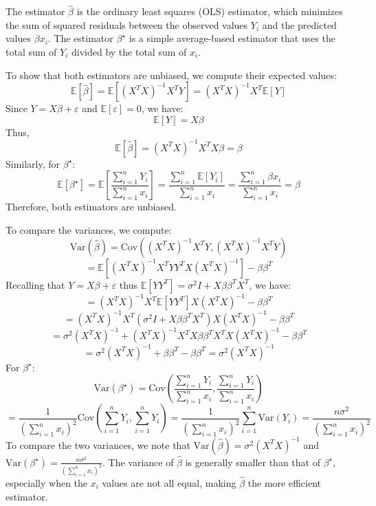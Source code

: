 \begin{answerenum}
    \item The estimator \(\hat{\beta}\) is the ordinary least squares (OLS) estimator, which minimizes the sum of squared residuals between the observed values \(Y_i\) and the predicted values \(\beta x_i\). The estimator \(\beta^{\star}\) is a simple average-based estimator that uses the total sum of \(Y_i\) divided by the total sum of \(x_i\).
    \item To show that both estimators are unbiased, we compute their expected values:
        \[ \mathbb{E}[\hat{\beta}] = \mathbb{E}\left[ (X^T X)^{-1} X^T Y \right] = (X^T X)^{-1} X^T \mathbb{E}[Y] \]
        Since \(Y = X\beta + \varepsilon\) and \(\mathbb{E}[\varepsilon] = 0\), we have:
        \[ \mathbb{E}[Y] = X\beta \]
        Thus,
        \[ \mathbb{E}[\hat{\beta}] = (X^T X)^{-1} X^T X \beta = \beta \]
        Similarly, for \(\beta^{\star}\):
        \[ \mathbb{E}[\beta^{\star}] = \mathbb{E}\left[ \frac{\sum_{i=1}^n Y_i}{\sum_{i=1}^n x_i} \right] = \frac{\sum_{i=1}^n \mathbb{E}[Y_i]}{\sum_{i=1}^n x_i} = \frac{\sum_{i=1}^n \beta x_i}{\sum_{i=1}^n x_i} = \beta \]
        Therefore, both estimators are unbiased.
    \item To compare the variances, we compute:
        \[ \text{Var}(\hat{\beta}) = \text{Cov}((X^T X)^{-1} X^T Y, (X^T X)^{-1} X^T Y) \]
        \[ = \mathbb{E}\left[ (X^T X)^{-1} X^T Y  Y^T X (X^T X)^{-1} \right] - \beta \beta^T \]
        Recalling that \( Y = X\beta + \varepsilon\) thus \( \mathbb{E}[Y Y^T] = \sigma^2 I + X\beta\beta^T X^T \), we have:
        \[ = (X^T X)^{-1} X^T \mathbb{E}[Y Y^T] X (X^T X)^{-1} - \beta \beta^T \]
        \[ = (X^T X)^{-1} X^T (\sigma^2 I + X\beta\beta^T X^T) X (X^T X)^{-1} - \beta \beta^T \]
        \[ = \sigma^2 (X^T X)^{-1} + (X^T X)^{-1} X^T X \beta\beta^T X^T X (X^T X)^{-1} - \beta \beta^T \]
        \[ = \sigma^2 (X^T X)^{-1} + \beta \beta^T - \beta \beta^T = \sigma^2 (X^T X)^{-1} \]
        For \(\beta^{\star}\):
        \[ \text{Var}(\beta^{\star}) = \text{Cov}\left( \frac{\sum_{i=1}^n Y_i}{\sum_{i=1}^n x_i}, \frac{\sum_{i=1}^n Y_i}{\sum_{i=1}^n x_i} \right) \]
        \[ = \frac{1}{(\sum_{i=1}^n x_i)^2} \text{Cov}\left( \sum_{i=1}^n Y_i, \sum_{i=1}^n Y_i \right) = \frac{1}{(\sum_{i=1}^n x_i)^2} \sum_{i=1}^n \text{Var}(Y_i) = \frac{n\sigma^2}{(\sum_{i=1}^n x_i)^2} \]
        To compare the two variances, we note that \(\text{Var}(\hat{\beta}) = \sigma^2 (X^T X)^{-1}\) and \(\text{Var}(\beta^{\star}) = \frac{n\sigma^2}{(\sum_{i=1}^n x_i)^2}\). The variance of \(\hat{\beta}\) is generally smaller than that of \(\beta^{\star}\), especially when the \(x_i\) values are not all equal, making \(\hat{\beta}\) the more efficient estimator.
\end{answerenum}